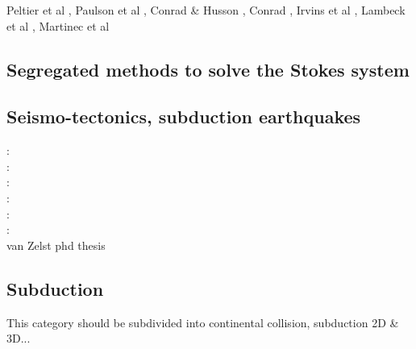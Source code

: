 \begin{scriptsize}
Peltier et al \cite{pefc78},
Paulson et al \cite{pazw07},
Conrad \& Husson \cite{cohu09},
Conrad \cite{conr13},
Irvins et al \cite{ivjw13},
Lambeck et al \cite{larp14},
Martinec et al \cite{makv18}
\end{scriptsize}

\subsection{Segregated methods to solve the Stokes system}

\begin{scriptsize}
\cite{raju91}
\cite{haeh93}
\cite{leru95}
\cite{duto98}
\cite{wade03}
\cite{wade04}
\cite{utne08}
\end{scriptsize}

\subsection{Seismo-tectonics, subduction earthquakes}

\begin{scriptsize}
\twothousandthree:
\cite{bocs03}\\
\twothousandtwelve:
\cite{wahh12}\\
\twothousandthirteen:
\cite{vagd13a,vagd13b}\cite{milp13}\cite{myhi13}\\
\twothousandfourteen:
\cite{vamd14}\\
\twothousandfifteen:
\cite{hevg15}\\
\twothousandeighteen:
\cite{gofv18}\cite{hefg18}\cite{hegv18}\\
\twothousandnineteen
\cite{vawg19} van Zelst phd thesis \cite{vanzelst}
\end{scriptsize}

\subsection{Subduction} 
This category should be subdivided into continental collision, subduction 2D \& 3D...

